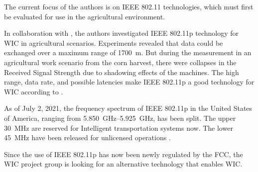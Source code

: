 The current focus of the authors is on IEEE 802.11 technologies, which must first be evaluated for use in the agricultural environment.

In collaboration with \textcite{klingler_agriculture_2018}, the authors investigated IEEE 802.11p technology for \ac{WIC} in agricultural scenarios. Experiments revealed that data could be exchanged over a maximum range of \SI{1700}{\metre}. But during the measurement in an agricultural work scenario from the corn harvest, there were collapses in the Received Signal Strength due to shadowing effects of the machines. The high range, data rate, and possible latencies make IEEE 802.11p a good technology for \ac{WIC} according to \textcite{schlingmann_challenges_2017}.

As of July 2, 2021, the frequency spectrum of IEEE 802.11p in the United States of America, ranging from \SIrange{5,850}{5,925}{\giga\hertz}, has been split. The upper \SI{30}{\mega\hertz} are reserved for Intelligent transportation systems now. The lower \SI{45}{\mega\hertz} have been released for unlicensed operations \cite{noauthor_use_2021}.

Since the use of IEEE 802.11p has now been newly regulated by the FCC, the \ac{WIC} project group is looking for an alternative technology that enables \ac{WIC}.